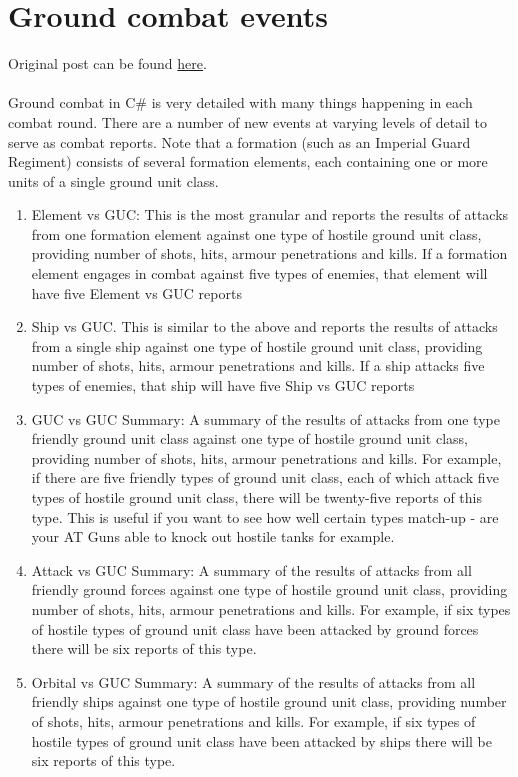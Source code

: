 \documentclass[../../Aurora C# unofficial manual.tex]{subfiles}
\begin{document}
	\section{Ground combat events}
	Original post can be found
	\href{http://aurora2.pentarch.org/index.php?topic=8495.msg116159#msg116159}{here}.
	\\\\
	
	Ground combat in C\# is very detailed with many things happening in each combat round. There are a number of new events at varying levels of detail to serve as combat reports. Note that a formation (such as an Imperial Guard Regiment) consists of several formation elements, each containing one or more units of a single ground unit class.
	\begin{enumerate}
		\item Element vs GUC: This is the most granular and reports the results of attacks from one formation element against one type of hostile ground unit class, providing number of shots, hits, armour penetrations and kills. If a formation element engages in combat against five types of enemies, that element will have five Element vs GUC reports
		\item Ship vs GUC. This is similar to the above and reports the results of attacks from a single ship against one type of hostile ground unit class, providing number of shots, hits, armour penetrations and kills. If a ship attacks five types of enemies, that ship will have five Ship vs GUC reports
		\item GUC vs GUC Summary: A summary of the results of attacks from one type friendly ground unit class against one type of hostile ground unit class, providing number of shots, hits, armour penetrations and kills. For example, if there are five friendly types of ground unit class, each of which attack five types of hostile ground unit class, there will be twenty-five reports of this type. This is useful if you want to see how well certain types match-up - are your AT Guns able to knock out hostile tanks for example.
		\item Attack vs GUC Summary:  A summary of the results of attacks from all friendly ground forces against one type of hostile ground unit class, providing number of shots, hits, armour penetrations and kills. For example, if six types of hostile types of ground unit class have been attacked by ground forces there will be six reports of this type.
		\item Orbital vs GUC Summary:  A summary of the results of attacks from all friendly ships against one type of hostile ground unit class, providing number of shots, hits, armour penetrations and kills. For example, if six types of hostile types of ground unit class have been attacked by ships there will be six reports of this type.

\end{enumerate}
\end{document}
